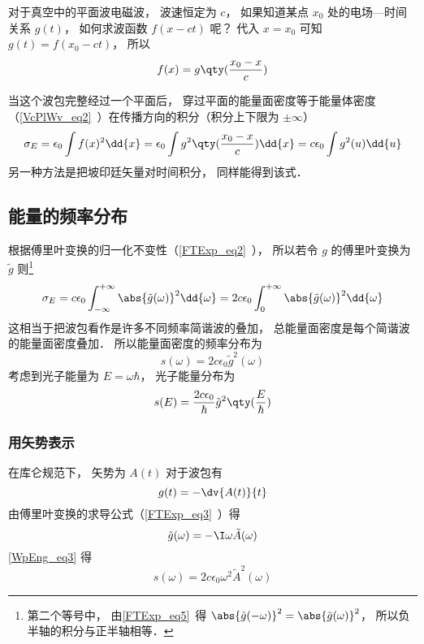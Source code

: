 

对于真空中的平面波电磁波， 波速恒定为 $c$， 如果知道某点 $x_0$ 处的电场—时间关系 $g(t)$， 如何求波函数 $f(x - ct)$ 呢？ 代入 $x = x_0$ 可知 $g(t) = f(x_0 - ct)$， 所以
\begin{equation}
f(x) = g\qty(\frac{x_0 - x}{c})
\end{equation}

当这个波包完整经过一个平面后， 穿过平面的能量面密度等于能量体密度（\autoref{VcPlWv_eq2}~）在传播方向的积分（积分上下限为 $\pm\infty$）
\begin{equation}\label{WpEng_eq1}
\sigma_E = \epsilon_0 \int f(x)^2 \dd{x} = \epsilon_0  \int g^2\qty(\frac{x_0 - x}{c}) \dd{x} = c\epsilon_0 \int g^2(u) \dd{u}
\end{equation}
另一种方法是把坡印廷矢量对时间积分， 同样能得到该式．

\subsection{能量的频率分布}
根据傅里叶变换的归一化不变性（\autoref{FTExp_eq2}~）， 所以若令 $g$ 的傅里叶变换为 $\tilde g$ 则\footnote{第二个等号中， 由\autoref{FTExp_eq5}~得 $\abs{\tilde g(-\omega)}^2 = \abs{\tilde g(\omega)}^2$， 所以负半轴的积分与正半轴相等．}
\begin{equation}
\sigma_E = c\epsilon_0 \int_{-\infty}^{+\infty} \abs{\tilde g(\omega)}^2 \dd{\omega} = 2c\epsilon_0 \int_{0}^{+\infty} \abs{\tilde g(\omega)}^2 \dd{\omega}
\end{equation}
这相当于把波包看作是许多不同频率简谐波的叠加， 总能量面密度是每个简谐波的能量面密度叠加． 所以能量面密度的频率分布为
\begin{equation}\label{WpEng_eq3}
s(\omega) = 2c\epsilon_0 {\tilde g}^2(\omega)
\end{equation}
考虑到光子能量为 $E = \omega\hbar$， 光子能量分布为
\begin{equation}\label{WpEng_eq2}
s(E) = \frac{2c\epsilon_0}{\hbar} {\tilde g}^2\qty(\frac{E}{\hbar})
\end{equation}

\subsubsection{用矢势表示}
在库仑规范下， 矢势为 $A(t)$ 对于波包有
\begin{equation}
g(t) = -\dv{A(t)}{t}
\end{equation}
由傅里叶变换的求导公式（\autoref{FTExp_eq3}~）得
\begin{equation}
\tilde g(\omega) = -\I \omega \tilde A(\omega)
\end{equation}
\autoref{WpEng_eq3} 得
\begin{equation}
s(\omega) = 2c\epsilon_0 \omega^2 {\tilde A}^2(\omega)
\end{equation}

